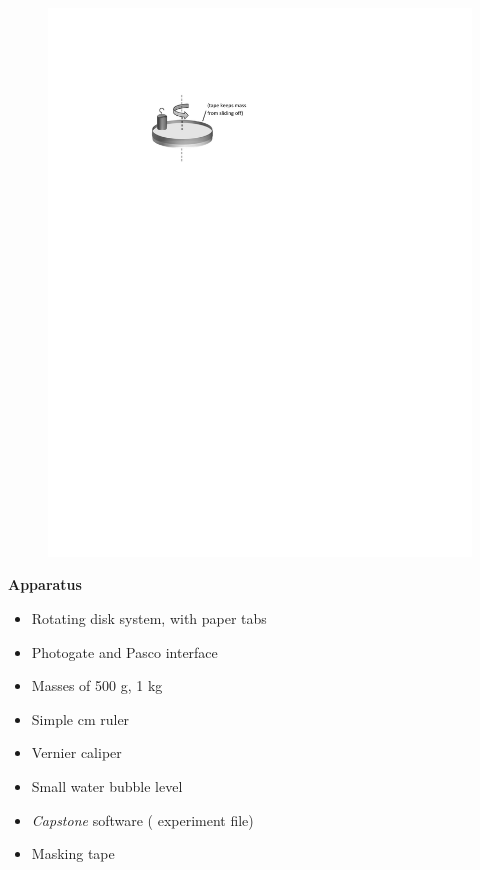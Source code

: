 \begin{figure}
    \includegraphics{cons_ang_mom/apparatus_fig.pdf}
\end{figure}

\bigskip

\textbf{Apparatus}

\begin{itemize}[nosep]
\item Rotating disk system, with paper tabs 
\item Photogate and Pasco interface
\item Masses of 500 g, 1 kg 
\item Simple cm ruler 
\item Vernier caliper
\item Small water bubble level
\item \textit{Capstone} software ( experiment file)
\item Masking tape
\end{itemize}

